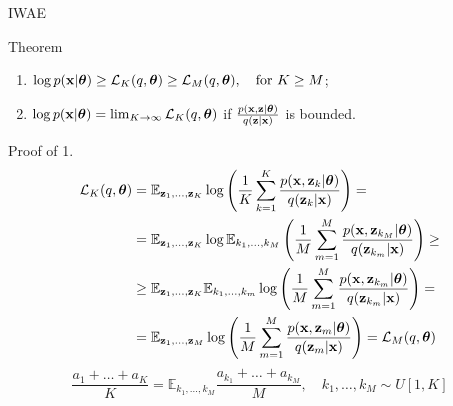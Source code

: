 \documentclass{beamer}
\begin{document}
\begin{frame}{IWAE}
	\begin{block}{Theorem}
		\begin{enumerate}
			\item $\log p(\mathbf{x} | \boldsymbol{\theta}) \geq \mathcal{L}_K (q, \boldsymbol{\theta}) \geq \mathcal{L}_M (q, \boldsymbol{\theta}), \quad \text{for } K \geq M$;
			\item $\log p(\mathbf{x} | \boldsymbol{\theta}) = \lim_{K \rightarrow \infty} \mathcal{L}_K (q, \boldsymbol{\theta})$ if $\frac{p(\mathbf{x}, \mathbf{z} | \boldsymbol{\theta})}{q(\mathbf{z} | \mathbf{x})}$ is bounded.
		\end{enumerate}
		\vspace{-0.2cm}
	\end{block}
	\begin{block}{Proof of 1.}
		{ \footnotesize
			\vspace{-0.6cm}
			\begin{align*}
				\mathcal{L}_K (q, \boldsymbol{\theta}) &= \mathbb{E}_{\mathbf{z}_1, \dots, \mathbf{z}_K} \log \left( \frac{1}{K}\sum_{k=1}^K\frac{p(\mathbf{x}, \mathbf{z}_k | \boldsymbol{\theta})}{q(\mathbf{z}_k| \mathbf{x})} \right) = \\
				&= \mathbb{E}_{\mathbf{z}_1, \dots, \mathbf{z}_K} \log \mathbb{E}_{k_1, \dots, k_M} \left( \frac{1}{M}\sum_{m=1}^M\frac{p(\mathbf{x}, \mathbf{z}_{k_M} | \boldsymbol{\theta})}{q(\mathbf{z}_{k_m}| \mathbf{x})} \right) \geq \\
				&\geq \mathbb{E}_{\mathbf{z}_1, \dots, \mathbf{z}_K} \mathbb{E}_{k_1, \dots, k_m} \log \left( \frac{1}{M}\sum_{m=1}^M\frac{p(\mathbf{x}, \mathbf{z}_{k_m} | \boldsymbol{\theta})}{q(\mathbf{z}_{k_m}| \mathbf{x})} \right) = \\
				&= \mathbb{E}_{\mathbf{z}_1, \dots, \mathbf{z}_M} \log \left( \frac{1}{M}\sum_{m=1}^M\frac{p(\mathbf{x}, \mathbf{z}_m | \boldsymbol{\theta})}{q(\mathbf{z}_m| \mathbf{x})} \right) = \mathcal{L}_M (q, \boldsymbol{\theta})
			\end{align*}
			\[
			\frac{a_1 + \dots + a_K}{K} = \mathbb{E}_{k_1, \dots, k_M} \frac{a_{k_1} + \dots + a_{k_M}}{M}, \quad k_1, \dots, k_M \sim U[1, K]
			\]
		}
	\end{block}
	
\end{frame}
\end{document}
